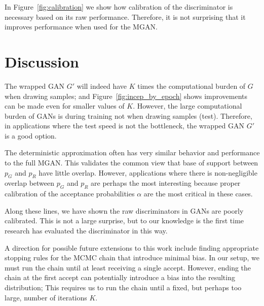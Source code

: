 \documentclass{article}
\newcommand{\PG}{{p_G}}
\newcommand{\PR}{{p_R}}
\newcommand{\accept}{\alpha}
\begin{document}
In Figure~\ref{fig:calibration} we show how calibration of the discriminator is necessary based on its raw performance.
Therefore, it is not surprising that it improves performance when used for the MGAN\@.


\section{Discussion}

The wrapped GAN $G'$ will indeed have $K$ times the computational burden of $G$ when drawing samples; and Figure~\ref{fig:incep_by_epoch} shows improvements can be made even for smaller values of $K$.
However, the large computational burden of GANs is during training not when drawing samples (test)\@.
Therefore, in applications where the test speed is not the bottleneck, the wrapped GAN $G'$ is a good option.

The deterministic approximation often has very similar behavior and performance to the full MGAN\@.
This validates the common view that base of support between $\PG$ and $\PR$ have little overlap.
However, applications where there is non-negligible overlap between $\PG$ and $\PR$ are perhaps the most interesting because proper calibration of the acceptance probabilities $\accept$ are the most critical in these cases.

Along these lines, we have shown the raw discriminators in GANs are poorly calibrated.
This is not a large surprise, but to our knowledge is the first time research has evaluated the discriminator in this way.

A direction for possible future extensions to this work include finding appropriate stopping rules for the MCMC chain that introduce minimal bias.
In our setup, we must run the chain until at least receiving a single accept.
However, ending the chain at the first accept can potentially introduce a bias into the resulting distribution; This requires us to run the chain until a fixed, but perhaps too large, number of iterations $K$.
\end{document}
